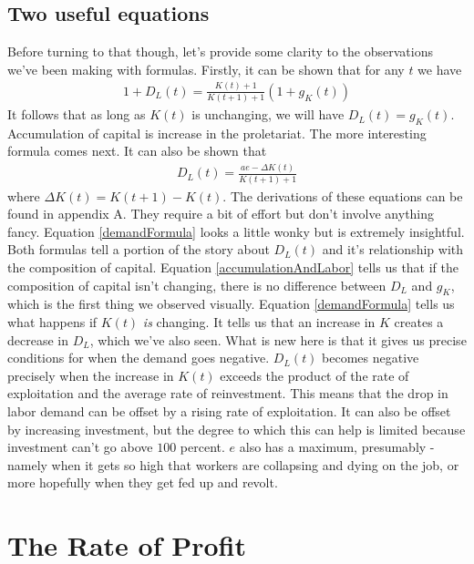 \documentclass{article}
\theoremstyle{theorem}
\begin{document}
\subsection{Two useful equations}
Before turning to that though, let's provide some clarity to the observations we've been making with formulas. Firstly, it can be shown that for any $t$ we have
\begin{align} 
	1+D_L(t) = \frac{K(t)+1}{K(t+1)+1}(1+g_K(t)) \label{accumulationAndLabor}
\end{align}
It follows that as long as $K(t)$ is unchanging, we will have $D_L(t) = g_K(t)$. Accumulation of capital is increase in the proletariat. The more interesting formula comes next. It can also be shown that
\begin{align}
	 D_L(t) = \frac{ae-\Delta K(t)}{K(t+1)+1} \label{demandFormula}
\end{align}
where $\Delta K(t) = K(t+1)-K(t)$. The derivations of these equations can be found in appendix A. They require a bit of effort but don't involve anything fancy. Equation \ref{demandFormula} looks a little wonky but is extremely insightful. Both formulas tell a portion of the story about $D_L(t)$ and it's relationship with the composition of capital. Equation \ref{accumulationAndLabor} tells us that if the composition of capital isn't changing, there is no difference between $D_L$ and $g_K$, which is the first thing we observed visually. Equation \ref{demandFormula} tells us what happens if $K(t)$ \emph{is} changing. It tells us that an increase in $K$ creates a decrease in $D_L$, which we've also seen. What is new here is that it gives us precise conditions for when the demand goes negative. $D_L(t)$ becomes negative precisely when the increase in $K(t)$ exceeds the product of the rate of exploitation and the average rate of reinvestment. This means that the drop in labor demand can be offset by a rising rate of exploitation. It can also be offset by increasing investment, but the degree to which this can help is limited because investment can't go above $100$ percent. $e$ also has a maximum, presumably - namely when it gets so high that workers are collapsing and dying on the job, or more hopefully when they get fed up and revolt. 
\section{The Rate of Profit}
\end{document}
